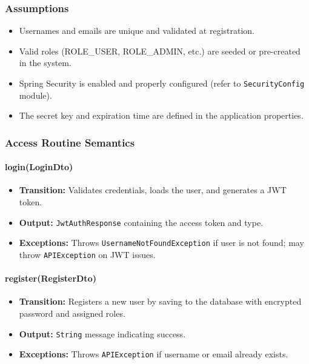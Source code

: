 \documentclass[12pt, titlepage]{article}
\begin{document}
\subsubsection{Assumptions}
\begin{itemize}
    \item Usernames and emails are unique and validated at registration.
    \item Valid roles (ROLE_USER, ROLE_ADMIN, etc.) are seeded or pre-created in the system.
    \item Spring Security is enabled and properly configured (refer to \texttt{SecurityConfig} module).
    \item The secret key and expiration time are defined in the application properties.
\end{itemize}

\subsubsection{Access Routine Semantics}

\paragraph{login(LoginDto)}
\begin{itemize}
    \item \textbf{Transition:} Validates credentials, loads the user, and generates a JWT token.
    \item \textbf{Output:} \texttt{JwtAuthResponse} containing the access token and type.
    \item \textbf{Exceptions:} Throws \texttt{UsernameNotFoundException} if user is not found; may throw \texttt{APIException} on JWT issues.
\end{itemize}

\paragraph{register(RegisterDto)}
\begin{itemize}
    \item \textbf{Transition:} Registers a new user by saving to the database with encrypted password and assigned roles.
    \item \textbf{Output:} \texttt{String} message indicating success.
    \item \textbf{Exceptions:} Throws \texttt{APIException} if username or email already exists.
\end{itemize}
\end{document}
